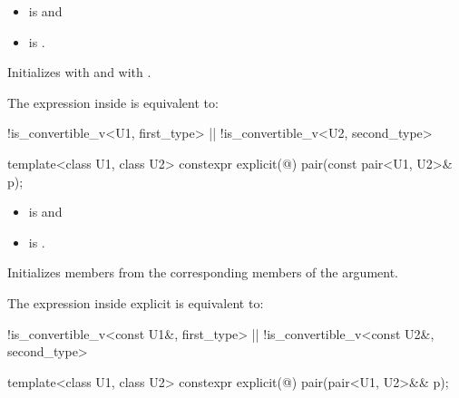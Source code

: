 \begin{itemdescr}
\pnum
\constraints
\begin{itemize}
\item {} is  and
\item {} is .
\end{itemize}

\pnum
\effects
Initializes  with
 and 
with .

\pnum
\remarks
The expression inside  is equivalent to:
\begin{codeblock}
!is_convertible_v<U1, first_type> || !is_convertible_v<U2, second_type>
\end{codeblock}
\end{itemdescr}

%
\begin{itemdecl}
template<class U1, class U2> constexpr explicit(@\seebelow@) pair(const pair<U1, U2>& p);
\end{itemdecl}

\begin{itemdescr}
\pnum
\constraints
\begin{itemize}
\item {} is  and
\item {} is .
\end{itemize}

\pnum
\effects
Initializes members from the corresponding members of the argument.

\pnum
\remarks
The expression inside explicit is equivalent to:
\begin{codeblock}
!is_convertible_v<const U1&, first_type> || !is_convertible_v<const U2&, second_type>
\end{codeblock}
\end{itemdescr}

%
\begin{itemdecl}
template<class U1, class U2> constexpr explicit(@\seebelow@) pair(pair<U1, U2>&& p);
\end{itemdecl}

